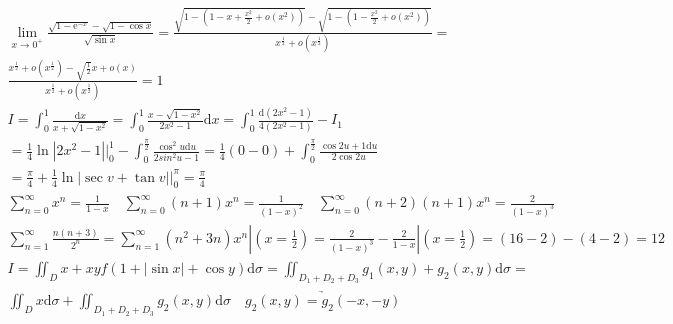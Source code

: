 \documentclass{article}
\begin{document}
\begin{align*}
    \lim_{x \to 0^{+}}\frac{\sqrt{1-\mathrm{e}^{-x}}-\sqrt{1-\cos x}}{\sqrt{\sin x}} = 
    \frac{\sqrt{1-(1-x+\frac{x^2}{2}+o(x^{2}))}-\sqrt{1-(1-\frac{x^2}{2}+o(x^{2}))}}{x^{\frac{1}{2}}+o(x^{\frac{1}{2}})} = \\ 
    \frac{x^{\frac{1}{2}}+o(x^\frac{1}{2})-\sqrt{\frac{1}{2}}x+o(x)}{x^{\frac{1}{2}}+o(x^{\frac{1}{2}})} = 1  \\ 
    I = \int_{0}^{1}\frac{\mathrm{d}x}{x+\sqrt{1-x^2}} =  \int_{0}^{1}\frac{x-\sqrt{1-x^2}}{2x^2-1}\mathrm{d}x = \int_{0}^{1}\frac{\mathrm{d}(2x^2-1)}{4(2x^2-1)} - I_{1} \\
    = \frac{1}{4}\ln|2x^2-1| |_{0}^{1} - \int_{0}^{\frac{\pi}{2}}\frac{\cos^{2} u\mathrm{d}u}{2sin^2 u-1} = \frac{1}{4}(0-0)+\int_{0}^{\frac{\pi}{2}}\frac{\cos 2u + 1\mathrm{d}u}{2\cos 2u} \\ 
    = \frac{\pi}{4} + \frac{1}{4}\ln|\sec v+\tan v| |_{0}^{\pi} = \frac{\pi}{4} \\ 
    \sum_{n=0}^{\infty}x^{n} = \frac{1}{1-x} \quad \sum_{n=0}^{\infty}(n+1)x^{n} = \frac{1}{(1-x)^{2}} \quad \sum_{n=0}^{\infty}(n+2)(n+1)x^{n} = \frac{2}{(1-x)^3}\\ 
    \sum_{n=1}^{\infty}\frac{n(n+3)}{2^{n}} = \sum_{n=1}^{\infty}(n^2+3n)x^{n} |(x=\frac{1}{2}) = \frac{2}{(1-x)^3}-\frac{2}{1-x}|(x=\frac{1}{2}) = (16-2) - (4-2) = 12 \\ 
    I = \iint_{D}x+xyf(1+|\sin x|+\cos y) \mathrm{d}\sigma = \iint_{D_{1}+D_{2}+D_{3}}g_{1}(x,y)+g_{2}(x,y) \mathrm{d}\sigma = \\ 
    \iint_{D}x\mathrm{d}\sigma +\iint_{D_{1}+D_{2}+D_{3}}g_{2}(x,y)\mathrm{d}\sigma \quad \underrightarrow{g_{2}(x,y)=g_{2}(-x,-y)} \\ 
\end{align*}
\end{document}
